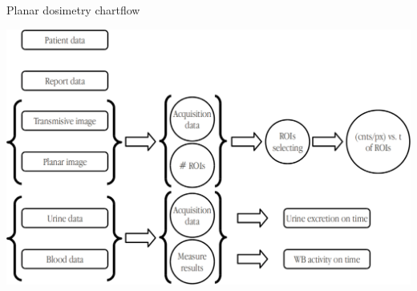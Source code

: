 \documentclass[ignorenonframetext,]{beamer}
\begin{document}
\begin{frame}{Planar dosimetry chartflow}
\protect\hypertarget{planar-dosimetry-chartflow}{}

\includegraphics{imgs/planar-chartflow.png}

\end{frame}
\end{document}
